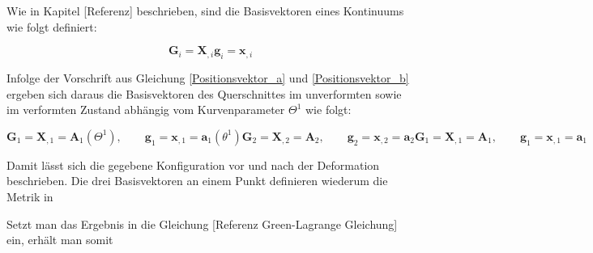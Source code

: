 \documentclass[german,a4paper,12pt,oneside]{scrbook}
\theoremstyle{definition}
\theoremstyle{definition}
\theoremstyle{definition}
\theoremstyle{definition}
\theoremstyle{definition}
\theoremstyle{definition}
\begin{document}
Wie in Kapitel [Referenz] beschrieben, sind die Basisvektoren eines Kontinuums wie folgt definiert:

\begin{subequations}
    \begin{equation}
        \bm{G}_i = \bm{X}_{,i}
    \end{equation}
    \begin{equation}
        \bm{g}_i = \bm{x}_{,i}
    \end{equation}
\end{subequations}

Infolge der Vorschrift aus Gleichung \eqref{Positionsvektor_a} und \eqref{Positionsvektor_b} ergeben sich daraus die Basisvektoren des Querschnittes im unverformten sowie im verformten Zustand abhängig vom Kurvenparameter $\Theta^1$ wie folgt: 

\begin{subequations}
    \begin{equation}
        \bm{G}_1 = \bm{X}_{,1} = \bm{A}_1(\Theta^1), \qquad     
        \bm{g}_1 = \bm{x}_{,1} = \bm{a}_1(\theta^1)
    \end{equation}
    \begin{equation}
        \bm{G}_2 = \bm{X}_{,2} = \bm{A}_2, \qquad     
        \bm{g}_2 = \bm{x}_{,2} = \bm{a}_2
    \end{equation}
    \begin{equation}
        \bm{G}_1 = \bm{X}_{,1} = \bm{A}_1, \qquad     
        \bm{g}_1 = \bm{x}_{,1} = \bm{a}_1
    \end{equation}
\end{subequations}

\vspace{1.0cm}
Damit lässt sich die gegebene Konfiguration vor und nach der Deformation beschrieben. 
Die drei Basisvektoren an einem Punkt definieren wiederum die Metrik in

Setzt man das Ergebnis in die Gleichung [Referenz Green-Lagrange Gleichung] ein, erhält man somit 
\end{document}

